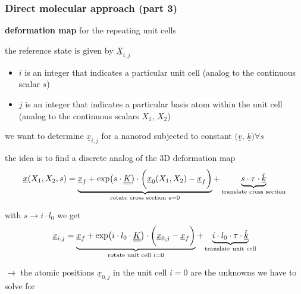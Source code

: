 \begin{frame}
  \frametitle{Direct molecular approach (part 3)}

  \textbf{deformation map} for the repeating unit cells
  
  \vspace{0.2em}
  the reference state is given by $\underline{X}_{i,j}$
  \begin{itemize} 
    \item $i$ is an integer that indicates a particular unit cell (analog to the continuous scalar $s$)
    \item $j$ is an integer that indicates a particular basis atom within the unit cell \newline (analog to the continuous scalars $X_1$, $X_2$)
  \end{itemize}
  
  \vspace{0.5em}
  we want to determine $\underline{x}_{i,j}$ for a nanorod subjected to constant $\bigl( \underline{v} , \, \underline{k} \bigr) \forall s$
  
  \vspace{0.2em}
  the idea is to find a discrete analog of the 3D deformation map
  \begin{displaymath}
    \underline{x}(X_1, X_2, s) = 
    \underbrace{ \underline{x}_f + \exp \bigl( s \cdot \underline{\underline{K}} \bigr) \cdot \biggl( \underline{x}_0(X_1,X_2) - \underline{x}_f \biggr) }_{\text{rotate cross section } s=0 } + 
    \underbrace{ s \cdot \tau \cdot \underline{\hat{k}} }_{\text{translate cross section}}
  \end{displaymath}
  
  \vspace{0.5em}
  with $s \rightarrow i \cdot l_0$ we get
  \begin{displaymath}
    \underline{x}_{i,j} = 
    \underbrace{ \underline{x}_f + \exp \bigl( i \cdot l_0 \cdot \underline{\underline{K}} \bigr) \cdot \biggl( \underline{x}_{0,j} - \underline{x}_f \biggr) }_{\text{rotate unit cell } i=0 } + 
    \underbrace{ i \cdot l_0 \cdot \tau \cdot \underline{\hat{k}} }_{\text{translate unit cell}}
  \end{displaymath}
  
  \vspace{0.2em}
  $\rightarrow$ the atomic positions $\underline{x}_{0,j}$ in the unit cell $i=0$ are the unknowns we have to solve for  
\end{frame}


